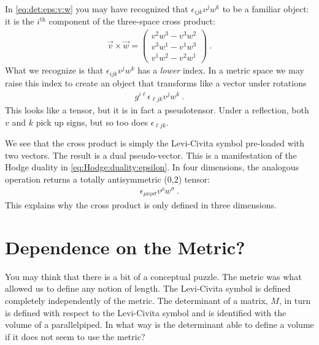 \documentclass[12pt, oneside]{report}    %
\let\oldsection\section
\def\section{%
  \setcounter{sidenote}{1}%
  \oldsection
}
\begin{document}
In \eqref{eq:det:eps:v:w} you may have recognized that $\epsilon_{ijk}v^j w^k$ to be a familiar object: it is the $i^\text{th}$ component of the three-space cross product:
\begin{align}
    \vec{v}\times \vec{w} = 
    \begin{pmatrix}
        v^2w^3 - v^3w^2 \\
        v^3 w^1 - v^1w^3 \\
        v^1 w^2 - v^2 w^1
    \end{pmatrix}
    \ .
\end{align}
What we recognize is that $\epsilon_{ijk}v^j w^k$ has a \emph{lower} index. In a metric space we may raise this index to create an object that transforms like a vector under rotations
\begin{align}
    g^{i\ell}\epsilon_{\ell j k}v^j w^k \ .
\end{align}
This looks like a tensor, but it is in fact a pseudotensor. Under a reflection, both $v$ and $k$ pick up signs, but so too does $\epsilon_{\ell j k}$. 

We see that the cross product is simply the Levi-Civita symbol pre-loaded with two vectors. The result is a dual pseudo-vector. This is a manifestation of the Hodge duality in \eqref{eq:Hodge:duality:epsilon}. In four dimensions, the analogous operation returns a totally antisymmetric (0,2) tensor:
\begin{align}
    \epsilon_{\mu\nu\rho\sigma}v^\rho w^\sigma \ .
\end{align}
This explains why the cross product is only defined in three dimensions. 


\section{Dependence on the Metric?}

You may think that there is a bit of a conceptual puzzle. The metric was what allowed us to define any notion of length. The Levi-Civita symbol is defined completely independently of the metric. The determinant of a matrix, $M$, in turn is defined with respect to the Levi-Civita symbol and is identified with the volume of a parallelpiped. In what way is the determinant able to define a volume if it does not seem to use the metric? 
\end{document}
